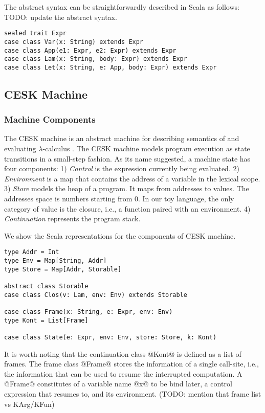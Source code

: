 \documentclass[acmsmall,review,anonymous]{acmart}\settopmatter{printfolios=true,printccs=false,printacmref=false}
\begin{document}
The abstract syntax can be straightforwardly described in Scala as follows:
TODO: update the abstract syntax.

\begin{lstlisting}
sealed trait Expr
case class Var(x: String) extends Expr
case class App(e1: Expr, e2: Expr) extends Expr
case class Lam(x: String, body: Expr) extends Expr
case class Let(x: String, e: App, body: Expr) extends Expr
\end{lstlisting}

\subsection{CESK Machine} \label{cesk}

\subsubsection{Machine Components}

The CESK machine is an
abstract machine for describing semantics of and evaluating $\lambda$-calculus \cite{felleisen1987calculus}.
The CESK machine models program execution as state transitions in a small-step fashion. 
As its name suggested, a machine state has four components: 
1) \textit{Control} is the expression currently being evaluated.
2) \textit{Environment} is a map that contains the address of a variable in the lexical scope.
3) \textit{Store} models the heap of a program. It maps from addresses to values.
The addresses space is numbers starting from 0.
In our toy language, the only category of value is the closure, i.e., a function paired with an environment.
4) \textit{Continuation} represents the program stack. 

We show the Scala representations for the components of CESK machine.

\begin{lstlisting}
type Addr = Int
type Env = Map[String, Addr]
type Store = Map[Addr, Storable]

abstract class Storable
case class Clos(v: Lam, env: Env) extends Storable

case class Frame(x: String, e: Expr, env: Env)
type Kont = List[Frame]

case class State(e: Expr, env: Env, store: Store, k: Kont)
\end{lstlisting}

It is worth noting that the continuation class @Kont@ is defined as a list of frames.
The frame class @Frame@ stores the information of a single call-site, 
i.e., the information that can be used to resume the interrupted computation.
A @Frame@ constitutes of a variable name @x@ to be bind later, a control expression
that resumes to, and its environment. (TODO: mention that frame list vs KArg/KFun)
\end{document}
